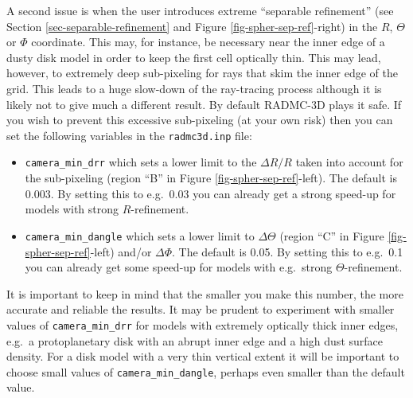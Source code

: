 \documentclass{report}
\begin{document}
A second issue is when the user introduces extreme ``separable refinement''
(see Section \ref{sec-separable-refinement} and Figure
\ref{fig-spher-sep-ref}-right) in the $R$, $\Theta$ or $\Phi$
coordinate. This may, for instance, be necessary near the inner edge of a
dusty disk model in order to keep the first cell optically thin. This may
lead, however, to extremely deep sub-pixeling for rays that skim the inner
edge of the grid. This leads to a huge slow-down of the ray-tracing process
although it is likely not to give much a different result. By default
RADMC-3D plays it safe. If you wish to prevent this excessive sub-pixeling
(at your own risk) then you can set the following variables in the
{\small\tt radmc3d.inp} file:
\begin{itemize}
\item {\small\tt camera\_min\_drr} which sets a lower limit to the $\Delta
  R/R$ taken into account for the sub-pixeling (region ``B'' in Figure
  \ref{fig-spher-sep-ref}-left). The default is 0.003. By setting this to
  e.g.\ 0.03 you can already get a strong speed-up for models with strong
  $R$-refinement. 
\item {\small\tt camera\_min\_dangle} which sets a lower limit to
  $\Delta\Theta$ (region ``C'' in Figure \ref{fig-spher-sep-ref}-left)
  and/or $\Delta\Phi$. The default is 0.05. By setting this to e.g.\ 0.1 you
  can already get some speed-up for models with e.g.\ strong
  $\Theta$-refinement.
\end{itemize}
It is important to keep in mind that the smaller you make this number, the
more accurate and reliable the results. It may be prudent to experiment with
smaller values of {\small\tt camera\_min\_drr} for models with extremely
optically thick inner edges, e.g.\ a protoplanetary disk with an abrupt
inner edge and a high dust surface density. For a disk model with a very
thin vertical extent it will be important to choose small values of
{\small\tt camera\_min\_dangle}, perhaps even smaller than the default
value.
\end{document}
